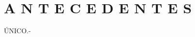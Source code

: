 \section*{A N T E C E D E N T E S}
\begin{description}
    \item[ÚNICO.-] \lipsum[1]
\end{description}